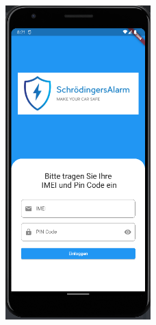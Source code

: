  \begin{figure}[H]
            \centering
            \includegraphics[width=0.5\textwidth]{Bilder/LoginIn.PNG}
    \end{figure}


